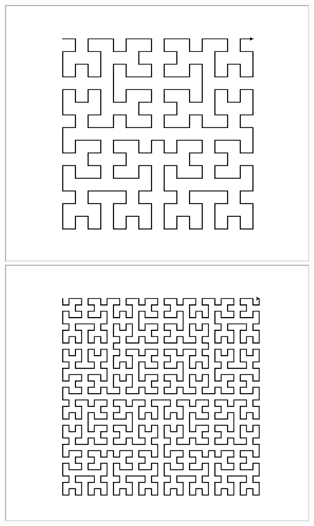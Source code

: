 \documentclass[11pt,class=report,crop=false]{standalone}
\begin{document}
\begin{activite}
\begin{enumerate}
\begin{center}
\includegraphics[scale=\myscale,scale=0.14]{ecran_tortue_hilbert4}\quad
\includegraphics[scale=\myscale,scale=0.14]{ecran_tortue_hilbert5}\quad

\end{center}
\end{enumerate}
\end{activite}
\end{document}
